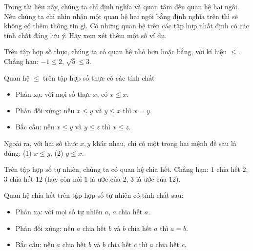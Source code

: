 Trong tài liệu này, chúng ta chỉ định nghĩa và quan tâm đến quan hệ hai ngôi. Nếu chúng ta chỉ nhìn nhận một quan hệ hai ngôi bằng định nghĩa trên thì sẽ không có thêm thông tin gì. Có những quan hệ trên các tập hợp nhất định có các tính chất đáng lưu ý. Hãy xem xét thêm một số ví dụ.

\begin{example}
    Trên tập hợp số thực, chúng ta có quan hệ nhỏ hơn hoặc bằng, với kí hiệu $\leq$. Chẳng hạn: $-1\leq 2$, $\sqrt{5}\leq 3$.

    \noindent Quan hệ $\leq$ trên tập hợp số thực có các tính chất
    \begin{itemize}
        \item Phản xạ: với mọi số thực $x$, có $x\leq x$.
        \item Phản đối xứng: nếu $x\leq y$ và $y\leq x$ thì $x = y$.
        \item Bắc cầu: nếu $x\leq y$ và $y\leq z$ thì $x\leq z$.
    \end{itemize}

    Ngoài ra, với hai số thực $x, y$ khác nhau, chỉ có một trong hai mệnh đề sau là đúng: (1) $x\leq y$, (2) $y\leq x$.
\end{example}

\begin{example}
    Trên tập hợp số tự nhiên, chúng ta có quan hệ chia hết. Chẳng hạn: $1$ chia hết $2$, $3$ chia hết $12$ (hay còn nói $1$ là ước của $2$, $3$ là ước của $12$).

    Quan hệ chia hết trên tập hợp số tự nhiên có tính chất sau:
    \begin{itemize}
        \item Phản xạ: với mọi số tự nhiên $a$, $a$ chia hết $a$.
        \item Phản đối xứng: nếu $a$ chia hết $b$ và $b$ chia hết $a$ thì $a = b$.
        \item Bắc cầu: nếu $a$ chia hết $b$ và $b$ chia hết $c$ thì $a$ chia hết $c$.
    \end{itemize}
\end{example}

